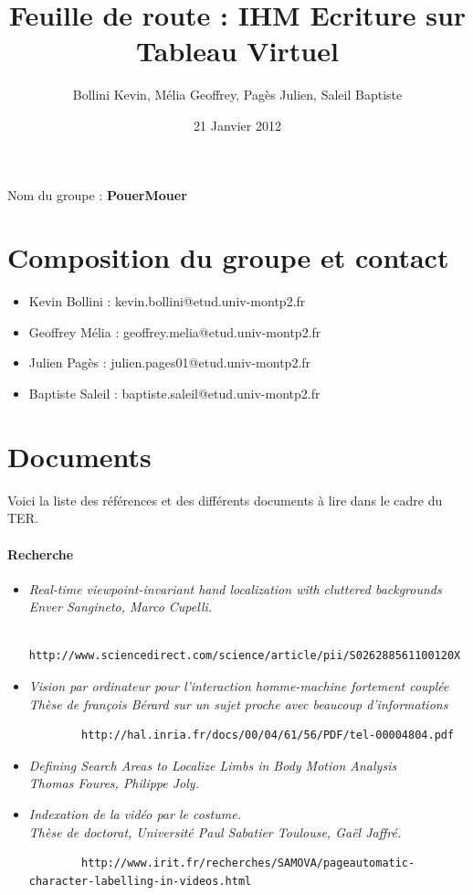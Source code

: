 \documentclass{article}
\title{Feuille de route : IHM Ecriture sur Tableau Virtuel}
\author{Bollini Kevin, Mélia Geoffrey, Pagès Julien, Saleil Baptiste}
\date{21 Janvier 2012}
\begin{document}
\maketitle
	Nom du groupe : \textbf{PouerMouer}
	\section{Composition du groupe et contact}
	
	\begin{itemize}
	\item Kevin Bollini : kevin.bollini@etud.univ-montp2.fr \\
	\item Geoffrey Mélia : geoffrey.melia@etud.univ-montp2.fr \\
	\item Julien Pagès : julien.pages01@etud.univ-montp2.fr \\
	\item Baptiste Saleil : baptiste.saleil@etud.univ-montp2.fr \\
	\end{itemize} 	

\section{Documents}
	Voici la liste des références et des différents documents à lire dans le cadre du TER. 

	\paragraph{Recherche}
	\begin{itemize}
		\item \it{Real-time viewpoint-invariant hand localization with cluttered backgrounds} \\
		Enver Sangineto, Marco Cupelli.
		\begin{verbatim}
		http://www.sciencedirect.com/science/article/pii/S026288561100120X
		\end{verbatim}
		\item \it{Vision par ordinateur pour l’interaction homme-machine fortement couplée}\\
		Thèse de françois Bérard sur un sujet proche avec beaucoup d'informations
		\begin{verbatim}
		http://hal.inria.fr/docs/00/04/61/56/PDF/tel-00004804.pdf
		\end{verbatim}
		\item \it{Defining Search Areas to Localize Limbs in Body Motion Analysis} \\
		Thomas Foures, Philippe Joly.
		\item \it{Indexation de la vidéo par le costume.}\\ 
		Thèse de doctorat, Université Paul Sabatier Toulouse, Gaël Jaffré.
		\begin{verbatim}
		http://www.irit.fr/recherches/SAMOVA/pageautomatic-character-labelling-in-videos.html
		\end{verbatim}
	\end{itemize}
\end{document}
